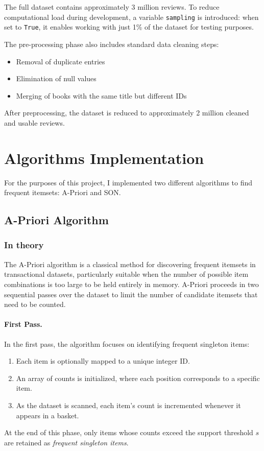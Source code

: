 \documentclass[a4paper,12pt]{article}
\begin{document}
The full dataset contains approximately 3 million reviews. To reduce computational load during development, a variable \texttt{sampling} is introduced: when set to \texttt{True}, it enables working with just 1\% of the dataset for testing purposes.

The pre-processing phase also includes standard data cleaning steps:

\begin{itemize}
    \item Removal of duplicate entries
    \item Elimination of null values
    \item Merging of books with the same title but different IDs
\end{itemize}

After preprocessing, the dataset is reduced to approximately 2 million cleaned and usable reviews.

\newpage
\section{Algorithms Implementation}

For the purposes of this project, I implemented two different algorithms to find frequent itemsets: A-Priori and SON.

\subsection{A-Priori Algorithm}
\subsubsection{In theory}

The A-Priori algorithm is a classical method for discovering frequent itemsets in transactional datasets, particularly suitable when the number of possible item combinations is too large to be held entirely in memory. A-Priori proceeds in two sequential passes over the dataset to limit the number of candidate itemsets that need to be counted.

\paragraph{First Pass.}  
In the first pass, the algorithm focuses on identifying frequent singleton items:
\begin{enumerate}
    \item Each item is optionally mapped to a unique integer ID.
    \item An array of counts is initialized, where each position corresponds to a specific item.
    \item As the dataset is scanned, each item's count is incremented whenever it appears in a basket.
\end{enumerate}
At the end of this phase, only items whose counts exceed the support threshold $s$ are retained as \textit{frequent singleton items}.
\end{document}
